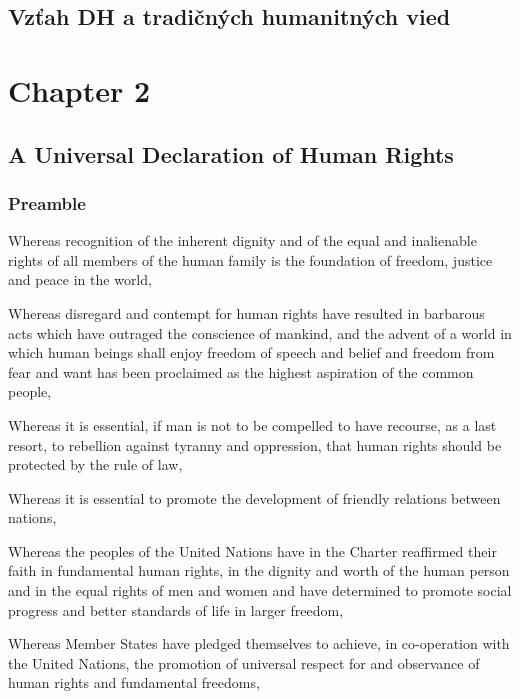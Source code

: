 \documentclass[
  titlepage,
  openright,
  DIV=calc,
  toc=listof,
  listof=nochaptergap]{scrbook}
\begin{document}
\section{Vzťah DH a tradičných humanitných
vied}\label{vzux165ah-dh-a-tradiux10dnuxfdch-humanitnuxfdch-vied}

\chapter{Chapter 2}\label{sec:chapter2}

\section{A Universal Declaration of Human
Rights}\label{a-universal-declaration-of-human-rights}

\subsection{Preamble}\label{preamble}

Whereas recognition of the inherent dignity and of the equal and
inalienable rights of all members of the human family is the foundation
of freedom, justice and peace in the world,

Whereas disregard and contempt for human rights have resulted in
barbarous acts which have outraged the conscience of mankind, and the
advent of a world in which human beings shall enjoy freedom of speech
and belief and freedom from fear and want has been proclaimed as the
highest aspiration of the common people,

Whereas it is essential, if man is not to be compelled to have recourse,
as a last resort, to rebellion against tyranny and oppression, that
human rights should be protected by the rule of law,

Whereas it is essential to promote the development of friendly relations
between nations,

Whereas the peoples of the United Nations have in the Charter reaffirmed
their faith in fundamental human rights, in the dignity and worth of the
human person and in the equal rights of men and women and have
determined to promote social progress and better standards of life in
larger freedom,

Whereas Member States have pledged themselves to achieve, in
co-operation with the United Nations, the promotion of universal respect
for and observance of human rights and fundamental freedoms,
\end{document}

